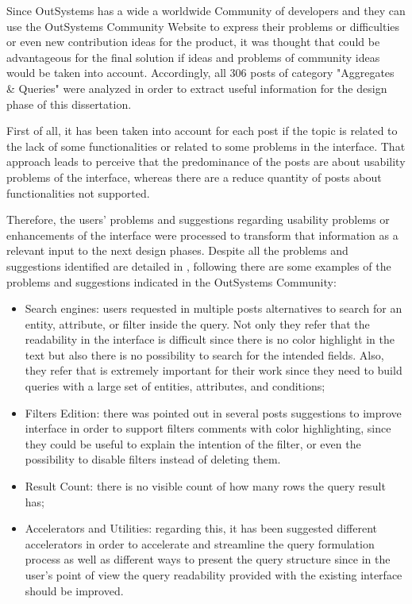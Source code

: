 Since OutSystems has a wide a worldwide Community of developers and they can use the OutSystems Community Website \cite{outsystems_community} to express their problems or difficulties or even new contribution ideas for the product, it was thought that could be advantageous for the final solution if ideas and problems of community ideas would be taken into account. Accordingly, all 306 posts of category "Aggregates \& Queries" were analyzed in order to extract useful information for the design phase of this dissertation.

First of all, it has been taken into account for each post if the topic is related to the lack of some functionalities or related to some problems in the interface. That approach leads to perceive that the predominance of the posts are about usability problems of the interface, whereas there are a reduce quantity of posts about functionalities not supported.

Therefore, the users’ problems and suggestions regarding usability problems or enhancements of the interface were processed to transform that information as a relevant input to the next design phases. Despite all the problems and suggestions identified are detailed in , following there are some examples of the problems and suggestions  indicated in the OutSystems Community:

\begin{itemize}
    \item Search engines: users requested in multiple posts alternatives to search for an entity, attribute, or filter inside the query. Not only they refer that the readability in the interface is difficult since there is no color highlight in the text but also there is no possibility to search for the intended fields. Also, they refer that is extremely important for their work since they need to build queries with a large set of entities, attributes, and conditions;
    \item Filters Edition: there was pointed out in several posts suggestions to improve interface in order to support filters comments with color highlighting, since they could be useful to explain the intention of the filter, or even the possibility to disable filters instead of deleting them.  
    \item Result Count: there is no visible count of how many rows the query result has;
    \item Accelerators and Utilities: regarding this, it has been suggested different accelerators in order to accelerate and streamline the query formulation process as well as different ways to present the query structure since in the user's point of view the query readability provided with the existing interface should be improved.
\end{itemize}

